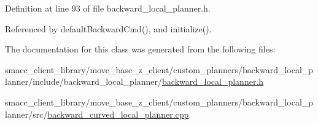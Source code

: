 Definition at line 93 of file backward\+\_\+local\+\_\+planner.\+h.



Referenced by default\+Backward\+Cmd(), and initialize().



The documentation for this class was generated from the following files\+:\begin{DoxyCompactItemize}
\item 
smacc\+\_\+client\+\_\+library/move\+\_\+base\+\_\+z\+\_\+client/custom\+\_\+planners/backward\+\_\+local\+\_\+planner/include/backward\+\_\+local\+\_\+planner/\hyperlink{backward__local__planner_8h}{backward\+\_\+local\+\_\+planner.\+h}\item 
smacc\+\_\+client\+\_\+library/move\+\_\+base\+\_\+z\+\_\+client/custom\+\_\+planners/backward\+\_\+local\+\_\+planner/src/\hyperlink{backward__curved__local__planner_8cpp}{backward\+\_\+curved\+\_\+local\+\_\+planner.\+cpp}\end{DoxyCompactItemize}
